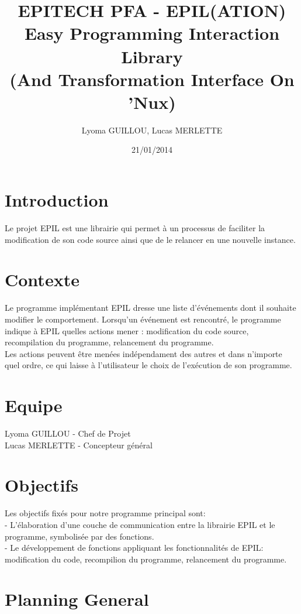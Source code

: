 \documentclass[12pt,a4paper]{article}
\title{\textbf{EPITECH PFA - EPIL}(ATION)\\
  \textbf{Easy Programming Interaction Library}\\
  (And Transformation Interface On 'Nux)}
\author{Lyoma GUILLOU, Lucas MERLETTE}
\date{21/01/2014}
\begin{document}
\maketitle

\newpage
\section{Introduction}
Le projet EPIL est une librairie qui permet \`{a} un processus de faciliter la modification de son code source ainsi que de le relancer en une nouvelle instance.

\section{Contexte}
Le programme impl\'{e}mentant EPIL dresse une liste d'\'{e}v\'{e}nements dont il souhaite modifier le comportement.
Lorsqu'un \'{e}v\'{e}nement est rencontr\'{e}, le programme indique \`{a} EPIL quelles actions mener : modification du code source, recompilation du programme, relancement du programme.\\
Les actions peuvent \^{e}tre men\'{e}es ind\'{e}pendament des autres et dans n'importe quel ordre, ce qui laisse \`{a} l'utilisateur le choix de l'ex\'{e}cution de son programme.

\newpage
\section{Equipe}
Lyoma GUILLOU - Chef de Projet\\
Lucas MERLETTE - Concepteur g\'{e}n\'{e}ral

\section{Objectifs}
Les objectifs fix\'{e}s pour notre programme principal sont:
\\- L'\'{e}laboration d'une couche de communication entre la librairie EPIL et le programme, symbolis\'{e}e par des fonctions.
\\- Le d\'{e}veloppement de fonctions appliquant les fonctionnalit\'{e}s de EPIL: modification du code, recompilion du programme, relancement du programme.

\section{Planning General}
\end{document}
